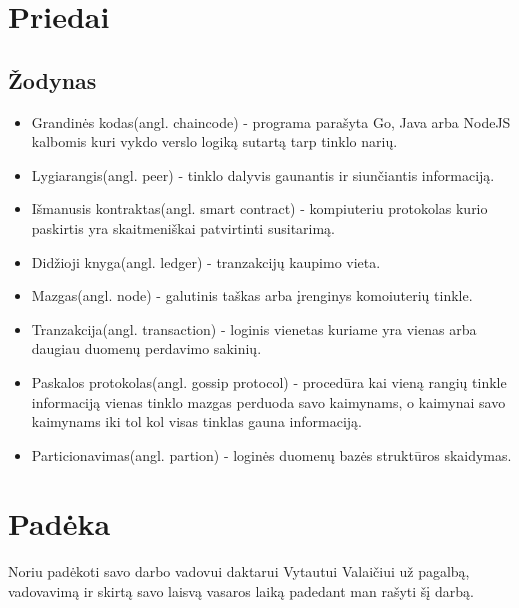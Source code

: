 \documentclass{VUMIFPSkursinis}
\begin{document}
\pagebreak

\section{Priedai}
\subsection{Žodynas}
\begin{itemize}
	\item{Grandinės kodas(angl. chaincode) - programa parašyta Go, Java arba NodeJS kalbomis kuri vykdo
 verslo logiką sutartą tarp tinklo narių.}
	\item{Lygiarangis(angl. peer) - tinklo dalyvis gaunantis ir siunčiantis informaciją.}
	\item{Išmanusis kontraktas(angl. smart contract) - kompiuteriu protokolas kurio paskirtis yra skaitmeniškai patvirtinti susitarimą.}
	\item{Didžioji knyga(angl. ledger) - tranzakcijų kaupimo vieta.}
	\item{Mazgas(angl. node) - galutinis taškas arba įrenginys komoiuterių tinkle.}
	\item{Tranzakcija(angl. transaction) - loginis vienetas kuriame yra vienas arba daugiau duomenų perdavimo sakinių.}
	\item{Paskalos protokolas(angl. gossip protocol) - procedūra kai vieną rangių tinkle informaciją vienas tinklo mazgas perduoda savo kaimynams, o kaimynai savo kaimynams iki tol kol visas tinklas gauna informaciją.}
	\item{Particionavimas(angl. partion) - loginės duomenų bazės struktūros skaidymas.}
\end{itemize}

\section{Padėka}
	Noriu padėkoti savo darbo vadovui daktarui Vytautui Valaičiui už pagalbą, vadovavimą ir skirtą savo laisvą vasaros laiką padedant man rašyti šį darbą.


\printbibliography[heading=bibintoc]  
\end{document}
